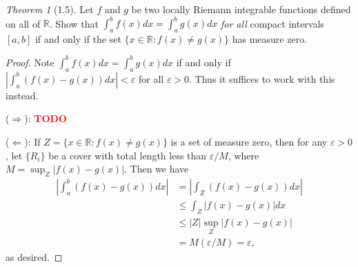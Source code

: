\documentclass[12pt]{article}
\newcommand{\todo}{\textcolor{red}{\textbf{TODO }}}
\theoremstyle{remark}
\theoremstyle{named}
\newtheorem*{theorem}{Theorem}
\newcommand{\e}{\varepsilon}
\newcommand{\R}{\mathbb R}
\newcommand{\bigabs}[1]{\left|#1\right|}
\begin{document}
\begin{theorem}[1.5]
    Let \(f\) and \(g\) be two locally Riemann integrable functions defined on all of \(\R\). Show that \(\int_{a}^{b}f(x) dx = \int_{a}^{b} g(x) dx\) \textit{for all} compact intervals \([a, b]\) if and only if the set \(\{x \in \R : f(x) \neq g(x)\}\) has measure zero.
\end{theorem}

\begin{proof}
    Note \(\int_{a}^{b}f(x) dx = \int_{a}^{b} g(x) dx\) if and only if \(\bigabs{\int_{a}^{b} (f(x) - g(x)) dx} < \e\) for all \(\e > 0\). Thus it suffices to work with this instead.

    (\(\Rightarrow\)): \todo

    (\(\Leftarrow\)): If \(Z = \{x \in \R : f(x) \neq g(x)\}\) is a set of measure zero, then for any \(\e > 0\), let \(\{R_i\}\) be a cover with total length less than \(\e / M\), where \(M = \sup_Z |f(x) - g(x)|\). Then we have 
    \begin{align*}
        \bigabs{\int_{a}^{b} (f(x) - g(x)) dx} &= \bigabs{\int_Z (f(x) - g(x)) dx} \\
        &\leq \int_Z |f(x) - g(x)| dx \\
        &\leq |Z| \sup_Z |f(x) - g(x)| \\
        &= M (\e / M) = \e,
    \end{align*}
    as desired.
\end{proof}
\end{document}
